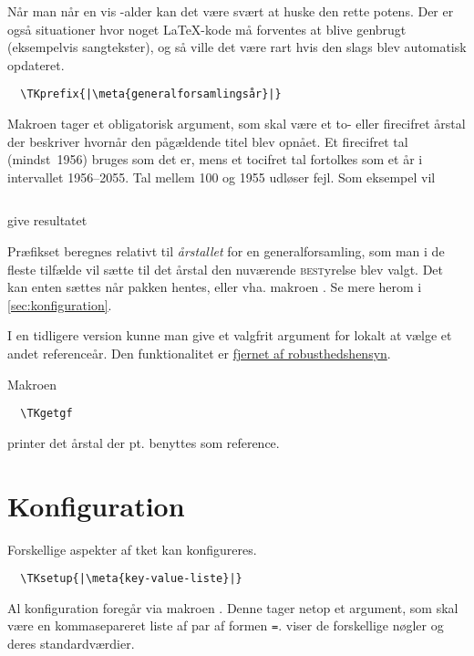 \documentclass[a4paper,article,oneside,danish]{memoir}
\newcommand{\pakkenavn}[1]{\textsf{#1}}
\newcommand{\ptket}{\pakkenavn{tket}\xspace}
\newcommand{\mdframedinputminted}[2]{\begin{mdframed}[style=kodestyle]\inputminted{#1}{#2}\end{mdframed}}
\begin{document}
Når man når en vis \TK-alder kan det være svært at huske den rette
potens. Der er også situationer hvor noget \LaTeX-kode må forventes at
blive genbrugt (eksempelvis sangtekster), og så ville det være rart
hvis den slags blev automatisk opdateret.

\begin{verbatim}
  \TKprefix{|\meta{generalforsamlingsår}|}
\end{verbatim}

Makroen  tager et obligatorisk argument, som skal være et
to- eller firecifret årstal der beskriver hvornår den pågældende titel
blev opnået. Et firecifret tal (mindst~1956) bruges som det er, mens
et tocifret tal fortolkes som et år i intervallet 1956--2055. Tal
mellem 100 og 1955 udløser fejl. Som eksempel vil

\mdframedinputminted{latex}{eksempel-prefix1.tex}
give resultatet

\begin{resultat}

\end{resultat}

Præfikset beregnes relativt til \emph{årstallet} for en
generalforsamling, som man i de fleste tilfælde vil sætte til det
årstal den nuværende \textsc{best}yrelse blev valgt. Det kan enten
sættes når pakken hentes, eller vha. makroen . Se mere
herom i \vref{sec:konfiguration}.

I en tidligere version kunne man give  et valgfrit
argument for lokalt at vælge et andet referenceår. Den funktionalitet
er \hyperref[sec:-og-]{fjernet af robusthedshensyn}.

Makroen
\begin{verbatim}
  \TKgetgf
\end{verbatim}
printer det årstal der pt. benyttes som reference.


\chapter{Konfiguration}
\label{sec:konfiguration}

Forskellige aspekter af \ptket kan konfigureres.

\begin{verbatim}
  \TKsetup{|\meta{key-value-liste}|}
\end{verbatim}

Al konfiguration foregår via makroen . Denne tager netop
et argument, som skal være en kommasepareret liste af par af formen
  \texttt{=}.
 viser de forskellige nøgler og deres
standardværdier.
\end{document}
